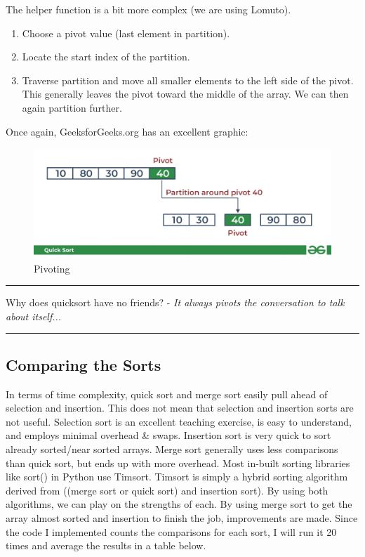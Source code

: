 \documentclass[letterpaper, 10pt]{article}
\begin{document}
 
The helper function is a bit more complex (we are using Lomuto).
\begin{enumerate}
    \item Choose a pivot value (last element in partition).
    \item Locate the start index of the partition.
    \item Traverse partition and move all smaller elements to the left side of the pivot. This generally leaves the pivot toward the middle of the array. We can then again partition further.
\end{enumerate}
Once again, GeeksforGeeks.org has an excellent graphic: 
\begin{figure}[H]
    \centering
    \includegraphics[width=.7\linewidth]{pivoting.png}
    \caption{Pivoting}
    \label{fig:enter-label}
\end{figure}

\hrule
\vspace{.25cm}
Why does quicksort have no friends? - \textit{It always pivots the conversation to talk about itself...}
\vspace{.25cm}
\hrule

\subsection{Comparing the Sorts}
In terms of time complexity, quick sort and merge sort easily pull ahead of selection and insertion. This does not mean that selection and insertion sorts are not useful. Selection sort is an excellent teaching exercise, is easy to understand, and employs minimal overhead \& swaps. Insertion sort is very quick to sort already sorted/near sorted arrays. Merge sort generally uses less comparisons than quick sort, but ends up with more overhead. Most in-built sorting libraries like sort() in Python use Timsort. Timsort is simply a hybrid sorting algorithm derived from ((merge sort or quick sort) and insertion sort). By using both algorithms, we can play on the strengths of each. By using merge sort to get the array almost sorted and insertion to finish the job, improvements are made. Since the code I implemented counts the comparisons for each sort, I will run it 20 times and average the results in a table below.
\end{document}
